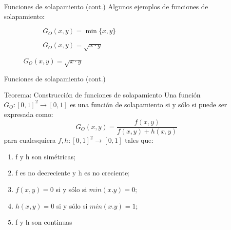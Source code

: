 \documentclass{beamer}
\begin{document}
\begin{frame}{Funciones de solapamiento (cont.)}
	Algunos ejemplos de funciones de solapamiento:
	\begin{figure}
	\begin{subfigure}{0.45\textwidth}
		\caption{$G_{O}(x,y) = \min\{x,y\}$}
		\setlength\figureheight{3cm}
		\setlength\figurewidth{4cm}
		
	\end{subfigure}
	\qquad
	\begin{subfigure}{0.45\textwidth}
		\caption{$G_{O}(x,y) = \sqrt{x \cdot y}$}
		\setlength\figureheight{3cm}
		\setlength\figurewidth{4cm}
		
	\end{subfigure}
	\end{figure}
\end{frame}

\begin{frame}{Funciones de solapamiento (cont.)}
	\begin{block}{Teorema: Construcción de funciones de solapamiento}
		Una función $G_{O} : [0,1]^{2} \rightarrow [0,1]$ es una función de solapamiento si y sólo si puede ser expresada como:
		\begin{equation}
		G_{O}(x,y) = \frac{f(x,y)}{f(x,y) + h(x,y)}
		\end{equation}
		para cualesquiera $f,h: [0,1]^{2} \rightarrow [0,1]$ tales que:
		\begin{enumerate}
		   \item f y h son simétricas;
		   \item f es no decreciente y h es no creciente;
		   \item $f(x,y) = 0$ si y sólo si $min(x.y) = 0$;
		   \item $h(x,y) = 0$ si y sólo si $min(x.y) = 1$;
		   \item f y h son continuas
		\end{enumerate}
	\end{block}
\end{frame}
\end{document}

